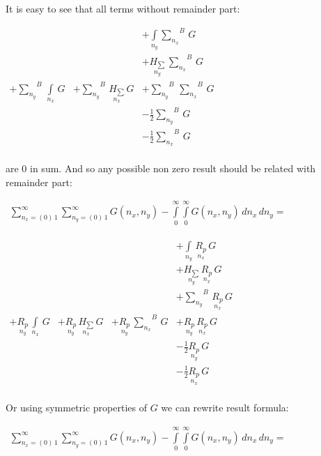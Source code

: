 \documentclass[11pt]{article}
\begin{document}
    It is easy to see that all terms without remainder part:

    \(\begin{array}{llll}  \,&  \,&  + \int\limits_{n_y}^{}{\sum\limits_{n_x}^{}}^{B}\,G \\  \,&  \,&  + \underset{n_y}{H_{\sum}}\,{\sum\limits_{n_x}^{}}^{B}\,G \\  + {\sum\limits_{n_y}^{}}^{B}\,\int\limits_{n_x}^{}\,G &  + {\sum\limits_{n_y}^{}}^{B}\,\underset{n_x}{H_{\sum}}\,G &  + {\sum\limits_{n_y}^{}}^{B}\,{\sum\limits_{n_x}^{}}^{B}\,G\\  \,&  \,&  - \frac{1}{2}{\sum\limits_{n_y}^{}}^{B}\,G \\  \,&  \,&  - \frac{1}{2}{\sum\limits_{n_x}^{}}^{B}\,G \\ \end{array}\)

    are 0 in sum. And so any possible non zero result should be related with
remainder part:

    \(\begin{array}{r} \sum\limits_{n_x=\left(0\right)\,1}^{\infty} \sum\limits_{n_y=\left(0\right)\,1}^{\infty} G\left(n_x, n_y\right) - \int\limits_{0}^{\infty} \int\limits_{0}^{\infty} G\left(n_x, n_y\right)\,d{n_x}\,d{n_y} = \end{array}\)

    \(\begin{array}{llll}  \,&  \,&  \,&  + \int\limits_{n_y}^{}\,\underset{n_x}{R_{p}}\,G \\  \,&  \,&  \,&  + \underset{n_y}{H_{\sum}}\,\underset{n_x}{R_{p}}\,G \\  \,&  \,&  \,&  + {\sum\limits_{n_y}^{}}^{B}\,\underset{n_x}{R_{p}}\,G \\  + \underset{n_y}{R_{p}}\,\int\limits_{n_x}^{}\,G &  + \underset{n_y}{R_{p}}\,\underset{n_x}{H_{\sum}}\,G &  + \underset{n_y}{R_{p}}\,{\sum\limits_{n_x}^{}}^{B}\,G &  + \underset{n_y}{R_{p}}\,\underset{n_x}{R_{p}}\,G \\  \,&  \,&  \,&  - \frac{1}{2}\underset{n_y}{R_{p}}\,G \\  \,&  \,&  \,&  - \frac{1}{2}\underset{n_x}{R_{p}}\,G \\ \end{array}\)

    Or using symmetric properties of \(G\) we can rewrite result formula:

    \(\begin{array}{r} \sum\limits_{n_x=\left(0\right)\,1}^{\infty} \sum\limits_{n_y=\left(0\right)\,1}^{\infty} G\left(n_x, n_y\right) - \int\limits_{0}^{\infty} \int\limits_{0}^{\infty} G\left(n_x, n_y\right)\,d{n_x}\,d{n_y} = \end{array}\)
\end{document}
